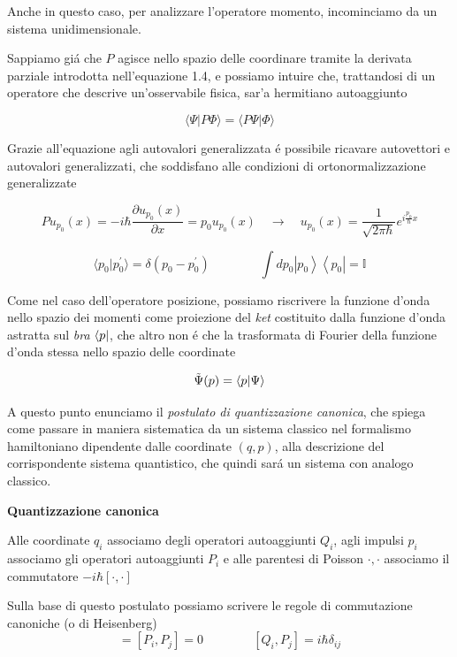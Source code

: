 Anche in questo caso, per analizzare l'operatore momento, incominciamo da un sistema unidimensionale.

Sappiamo gi\'a che $P$ agisce nello spazio delle coordinare tramite la derivata parziale introdotta nell'equazione 1.4, e possiamo intuire che, trattandosi di un operatore che descrive un'osservabile fisica, sar'a hermitiano autoaggiunto

$$\langle\Psi|P\Phi\rangle=\langle P\Psi|\Phi\rangle$$

Grazie all'equazione agli autovalori generalizzata \'e possibile ricavare autovettori e autovalori generalizzati, che soddisfano alle condizioni di ortonormalizzazione generalizzate

$$P u_{p_{0}}(x)=-i\hbar{\frac{\partial u_{p_{0}}(x)}{\partial x}}=p_{0}u_{p_{0}}(x)\quad\longrightarrow\quad u_{p_{0}}(x)={\frac{1}{\sqrt{2\pi\hbar}}}e^{i{\frac{p_{0}}{\hbar}}x}$$

$$\langle p_{0}|p_{0}^{\prime}\rangle=\delta(p_{0}-p_{0}^{\prime}) \qquad\qquad \int d p_{0}\left|p_{0}\right\rangle\left\langle p_{0}\right|=\mathbb{I}$$

Come nel caso dell'operatore posizione, possiamo riscrivere la funzione d'onda nello spazio dei momenti come proiezione del \textit{ket} costituito dalla funzione d'onda astratta sul \textit{bra} $\bra{p}$, che altro non \'e che la trasformata di Fourier della funzione d'onda stessa nello spazio delle coordinate 

$$\tilde{\Psi}(p) = \braket{p}{\Psi}$$

A questo punto enunciamo il \textit{postulato di quantizzazione canonica}, che spiega come passare in maniera sistematica da un sistema classico nel formalismo hamiltoniano dipendente dalle coordinate $(q, p)$, alla descrizione del corrispondente sistema quantistico, che quindi sar\'a un sistema con analogo classico. 

\begin{postulato} \textbf{Quantizzazione canonica}

Alle coordinate $q_i$ associamo degli operatori autoaggiunti $Q_i$, agli impulsi $p_i$ associamo gli operatori autoaggiunti $P_i$ e alle parentesi di Poisson ${\cdot, \cdot}$ associamo il commutatore $-i\hbar[\cdot, \cdot]$
\end{postulato}

Sulla base di questo postulato possiamo scrivere le regole di commutazione canoniche (o di Heisenberg)
\begin{equation}
	[Q_{i},Q_{j}]=[P_{i},P_{j}]=0\qquad\qquad[Q_{i},P_{j}]=i\hbar\delta_{i j}
\end{equation}

